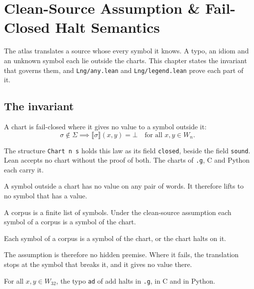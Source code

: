 \chapter{Clean-Source Assumption \& Fail-Closed Halt Semantics}
\label{ch:legend}

The atlas translates a source whose every symbol it knows. A typo, an idiom and an unknown symbol each lie outside
the charts. This chapter states the invariant that governs them, and \texttt{Lng/any.lean} and
\texttt{Lng/legend.lean} prove each part of it.

\section{The invariant}

\begin{definition}
A chart is fail-closed where it gives no value to a symbol outside it:
\[
  \sigma \notin \Sigma \implies \lBrack\sigma\rBrack(x, y) = \bot \quad \text{for all } x, y \in W_n.
\]
\end{definition}

The structure \texttt{Chart n s} holds this law as its field \texttt{closed}, beside the field \texttt{sound}. Lean
accepts no chart without the proof of both. The charts of \texttt{.g}, C and Python each carry it.

\begin{theorem}
A symbol outside a chart has no value on any pair of words. It therefore lifts to no symbol that has a value.
\end{theorem}

\begin{definition}
A corpus is a finite list of symbols. Under the clean-source assumption each symbol of a corpus is a symbol of the
chart.
\end{definition}

\begin{theorem}
Each symbol of a corpus is a symbol of the chart, or the chart halts on it.
\end{theorem}

The assumption is therefore no hidden premise. Where it fails, the translation stops at the symbol that breaks
it, and it gives no value there.

\begin{theorem}
For all $x, y \in W_{32}$, the typo \texttt{ad} of add halts in \texttt{.g}, in C and in Python.
\end{theorem}


